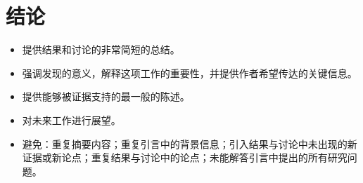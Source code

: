 \section*{结论}
\begin{itemize}
\item 提供结果和讨论的非常简短的总结。
\item 强调发现的意义，解释这项工作的重要性，并提供作者希望传达的关键信息。
\item 提供能够被证据支持的最一般的陈述。
\item 对未来工作进行展望。
\item 避免：重复摘要内容；重复引言中的背景信息；引入结果与讨论中未出现的新证据或新论点；重复结果与讨论中的论点；未能解答引言中提出的所有研究问题。
\end{itemize}

